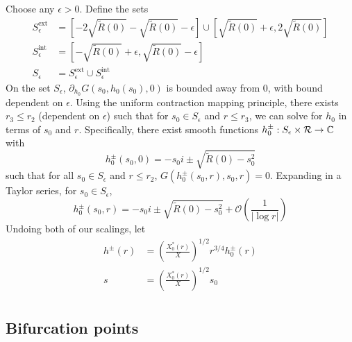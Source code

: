 \documentclass[thesis.tex]{subfiles}
\begin{document}
Choose any $\epsilon > 0$. Define the sets
\begin{align*}
S_\epsilon^{\text{ext}} &= \left[-2 \sqrt{\tilde{R}(0)} -\sqrt{\tilde{R}(0)} - \epsilon\right] \cup \left[\sqrt{\tilde{R}(0)} + \epsilon, 2\sqrt{\tilde{R}(0)}\right] \\
S_\epsilon^{\text{int}} &= 
\left[-\sqrt{\tilde{R}(0)} + \epsilon, \sqrt{\tilde{R}(0)} - \epsilon\right] \\
S_\epsilon &= S_\epsilon^{\text{ext}} \cup S_\epsilon^{\text{int}}
\end{align*}
On the set $S_\epsilon$, $\partial_{h_0} G(s_0, h_0(s_0), 0)$ is bounded away from 0, with bound dependent on $\epsilon$. Using the uniform contraction mapping principle, there exists $r_3 \leq r_2$ (dependent on $\epsilon$) such that for $s_0 \in S_\epsilon$ and $r \leq r_3$, we can solve for $h_0$ in terms of $s_0$ and $r$. Specifically, there exist smooth functions $h_0^\pm: S_\epsilon \times \mathcal{R} \rightarrow \mathbb{C}$ with
\[
h_0^\pm(s_0, 0) = -s_0 i \pm \sqrt{ \tilde{R}(0) - s_0^2 }
\]
such that for all $s_0 \in S_\epsilon$ and $r \leq r_2$, $G(h_0^\pm(s_0,r),s_0,r) = 0$. Expanding in a Taylor series, for $s_0 \in S_\epsilon$,
\[
h_0^\pm(s_0, r) = -s_0 i \pm \sqrt{ \tilde{R}(0) - s_0^2 } + \mathcal{O}\left( \frac{1}{|\log r|} \right)
\]
Undoing both of our scalings, let
\begin{align*}
h^\pm(r) &= \left(\frac{X_0^*(r)}{X}\right)^{1/2} r^{3/4} h_0^\pm(r) \\
s &= \left(\frac{X_0^*(r)}{X}\right)^{1/2} s_0 \\
\end{align*}

\subsection{Bifurcation points}
\end{document}
